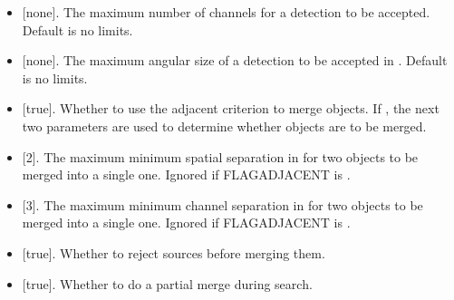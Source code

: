 \documentclass[letterpaper,10pt,english]{sphinxmanual}
\begin{document}
\begin{itemize}
\item {} 
 {[}none{]}. The maximum number of channels for a detection to be accepted. Default is no limits.

\item {} 
 {[}none{]}. The maximum angular size of a detection to be accepted in . Default is no limits.

\item {} 
 {[}true{]}. Whether to use the adjacent criterion to merge objects. If , the next two parameters are used to determine whether objects are to be merged.

\item {} 
 {[}2{]}. The maximum minimum spatial separation in  for two objects to be merged into a single one. Ignored if FLAGADJACENT is .

\item {} 
 {[}3{]}. The maximum minimum channel separation in  for two objects to be merged into a single one. Ignored if FLAGADJACENT is .

\item {} 
 {[}true{]}. Whether to reject sources before merging them.

\item {} 
 {[}true{]}. Whether to do a partial merge during search.

\end{itemize}
\end{document}
